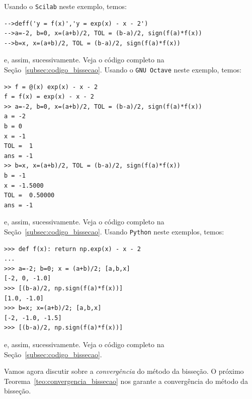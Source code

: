 \begin{sol}
\ifisscilab
Usando o \verb+Scilab+ neste exemplo, temos:
\begin{verbatim}
-->deff('y = f(x)','y = exp(x) - x - 2')
-->a=-2, b=0, x=(a+b)/2, TOL = (b-a)/2, sign(f(a)*f(x))
-->b=x, x=(a+b)/2, TOL = (b-a)/2, sign(f(a)*f(x))
\end{verbatim}
  e, assim, sucessivamente. Veja o código completo na Seção~\ref{subsec:codigo_bissecao}.
\fi    
\ifisoctave
Usando o \verb+GNU Octave+ neste exemplo, temos:
\begin{verbatim}
>> f = @(x) exp(x) - x - 2
f = f(x) = exp(x) - x - 2
>> a=-2, b=0, x=(a+b)/2, TOL = (b-a)/2, sign(f(a)*f(x))
a = -2
b = 0
x = -1
TOL =  1
ans = -1
>> b=x, x=(a+b)/2, TOL = (b-a)/2, sign(f(a)*f(x))
b = -1
x = -1.5000
TOL =  0.50000
ans = -1
\end{verbatim}
e, assim, sucessivamente. Veja o código completo na Seção~\ref{subsec:codigo_bissecao}.
\fi    
\ifispython
Usando \verb+Python+ neste exemplos, temos:
\begin{verbatim}
>>> def f(x): return np.exp(x) - x - 2
... 
>>> a=-2; b=0; x = (a+b)/2; [a,b,x]
[-2, 0, -1.0]
>>> [(b-a)/2, np.sign(f(a)*f(x))]
[1.0, -1.0]
>>> b=x; x=(a+b)/2; [a,b,x]
[-2, -1.0, -1.5]
>>> [(b-a)/2, np.sign(f(a)*f(x))]
\end{verbatim}
e, assim, sucessivamente. Veja o código completo na Seção~\ref{subsec:codigo_bissecao}.
\fi    
\end{sol}

Vamos agora discutir sobre a \emph{convergência} do método da bisseção. O próximo Teorema~\ref{teo:convergencia_bissecao} nos garante a convergência do método da bisseção.

